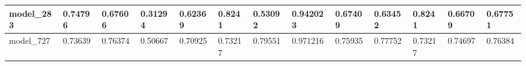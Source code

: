 \begin{tabular}{|l|l|l|l|l|l|l|l|l|l|l|l|l|}
model\_283     & 0.74796     & 0.67606        & 0.31294      & 0.62369          & 0.8241               & 0.53092              & 0.942023     & 0.67409           & 0.63452            & 0.8241          & 0.66709     & 0.67751      \\ \hline
model\_727     & 0.73639     & 0.76374        & 0.50667      & 0.70925          & 0.73217              & 0.79551              & 0.971216     & 0.75935           & 0.77752            & 0.73217         & 0.74697     & 0.76384      \\ \hline
\end{tabular}